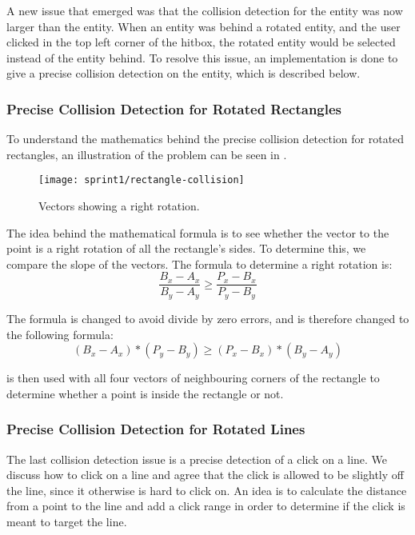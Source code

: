 A new issue that emerged was that the collision detection for the entity was now larger than the entity.
When an entity was behind a rotated entity, and the user clicked in the top left corner of the hitbox, the rotated entity would be selected instead of the entity behind.
To resolve this issue, an implementation is done to give a precise collision detection on the entity, which is described below.

\subsubsection{Precise Collision Detection for Rotated Rectangles}
To understand the mathematics behind the precise collision detection for rotated rectangles, an illustration of the problem can be seen in .

\begin{figure}[h]
	\centering
	\texttt{[image: sprint1/rectangle-collision]}
	\caption{Vectors showing a right rotation.}
	\label{figure:rectangle-collision}
\end{figure}

The idea behind the mathematical formula is to see whether the vector to the point is a right rotation of all the rectangle's sides.
To determine this, we compare the slope of the vectors.
The formula to determine a right rotation is:
\begin{equation}
	\frac{B_x-A_x}{B_y-A_y} \geq \frac{P_x-B_x}{P_y-B_y}
\end{equation}

The formula is changed to avoid divide by zero errors, and is therefore changed to the following formula:
\begin{equation}\label{eq:crossPRectangle}
	(B_x-A_x)*(P_y-B_y) \geq (P_x-B_x)*(B_y-A_y)
\end{equation} 

 is then used with all four vectors of neighbouring corners of the rectangle to determine whether a point is inside the rectangle or not.




\subsubsection{Precise Collision Detection for Rotated Lines} \label{sec:rotatedlines}
The last collision detection issue is a precise detection of a click on a line.
We discuss how to click on a line and agree that the click is allowed to be slightly off the line, since it otherwise is hard to click on.
An idea is to calculate the distance from a point to the line and add a click range in order to determine if the click is meant to target the line.

